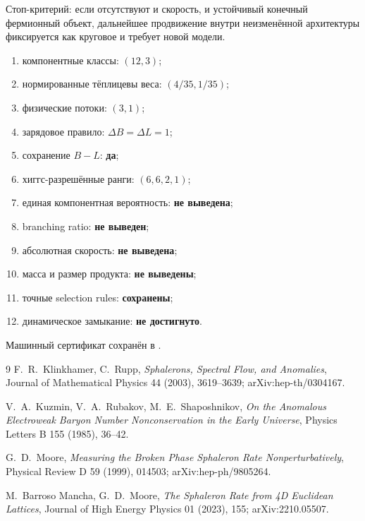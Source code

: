 Стоп-критерий: если отсутствуют и скорость, и устойчивый конечный
фермионный объект, дальнейшее продвижение внутри неизменённой
архитектуры фиксируется как круговое и требует новой модели.

\begin{protocol}
\begin{enumerate}
 \item компонентные классы: \textbf{$(12,3)$};
 \item нормированные тёплицевы веса: \textbf{$(4/35,1/35)$};
 \item физические потоки: \textbf{$(3,1)$};
 \item зарядовое правило: \textbf{$\Delta B=\Delta L=1$};
 \item сохранение $B-L$: \textbf{да};
 \item хиггс-разрешённые ранги: \textbf{$(6,6,2,1)$};
 \item единая компонентная вероятность: \textbf{не выведена};
 \item branching ratio: \textbf{не выведен};
 \item абсолютная скорость: \textbf{не выведена};
 \item масса и размер продукта: \textbf{не выведены};
 \item точные selection rules: \textbf{сохранены};
 \item динамическое замыкание: \textbf{не достигнуто}.
\end{enumerate}
\end{protocol}

Машинный сертификат сохранён в
.

\begin{thebibliography}{9}
F.~R.~Klinkhamer, C.~Rupp,
\emph{Sphalerons, Spectral Flow, and Anomalies},
Journal of Mathematical Physics 44 (2003), 3619--3639;
arXiv:hep-th/0304167.

V.~A.~Kuzmin, V.~A.~Rubakov, M.~E.~Shaposhnikov,
\emph{On the Anomalous Electroweak Baryon Number Nonconservation in the
Early Universe},
Physics Letters B 155 (1985), 36--42.

G.~D.~Moore,
\emph{Measuring the Broken Phase Sphaleron Rate Nonperturbatively},
Physical Review D 59 (1999), 014503; arXiv:hep-ph/9805264.

M.~Barroso Mancha, G.~D.~Moore,
\emph{The Sphaleron Rate from 4D Euclidean Lattices},
Journal of High Energy Physics 01 (2023), 155;
arXiv:2210.05507.
\end{thebibliography}